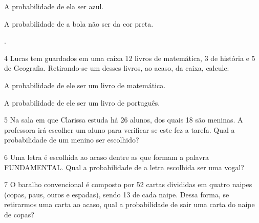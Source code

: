 {\begin{escolha}
\item
  A probabilidade de ela ser azul.


\item
  A probabilidade de a bola não ser da cor preta.

.
\end{escolha}


\num{4} Lucas tem guardados em uma caixa 12 livros de matemática, 3 de
história e 5 de Geografia. Retirando-se um desses livros, ao acaso, da
caixa, calcule:

\begin{escolha}
\item
  A probabilidade de ele ser um livro de matemática.


\item
  A probabilidade de ele ser um livro de português.

\end{escolha}


\num{5} Na sala em que Clarissa estuda há 26 alunos, dos quais 18 são
meninas. A professora irá escolher um aluno para verificar se este fez a
tarefa. Qual a probabilidade de um menino ser escolhido?



\num{6} Uma letra é escolhida ao acaso dentre as que formam a palavra
FUNDAMENTAL. Qual a probabilidade de a letra escolhida ser uma vogal?



\num{7} O baralho convencional é composto por 52 cartas divididas em quatro
naipes (copas, paus, ouros e espadas), sendo 13 de cada naipe. Dessa
forma, se retirarmos uma carta ao acaso, qual a probabilidade de sair
uma carta do naipe de copas?

}
